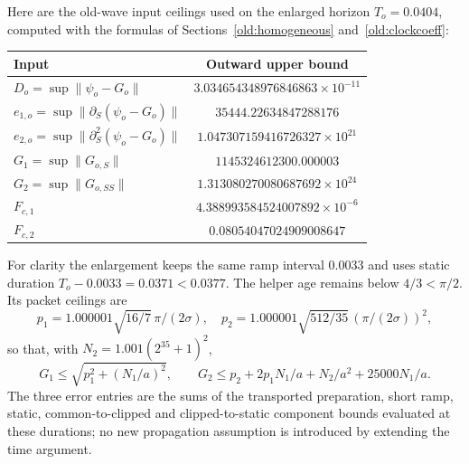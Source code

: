 \documentclass[11pt]{article}
\theoremstyle{definition}\newtheorem{definition}[theorem]{Definition}
\theoremstyle{remark}\newtheorem{remark}[theorem]{Remark}
\begin{document}
Here are the old-wave input ceilings used on the enlarged horizon
$T_o=0.0404$, computed with the formulas of
Sections~\ref{old:homogeneous} and~\ref{old:clockcoeff}:
\begin{center}
\begin{tabular}{lc}
\toprule
Input & Outward upper bound\\
\midrule
$D_o=\sup\|\psi_o-G_o\|$ & $3.034654348976846863\times10^{-11}$\\
$e_{1,o}=\sup\|\partial_S(\psi_o-G_o)\|$ & $35444.22634847288176$\\
$e_{2,o}=\sup\|\partial_S^2(\psi_o-G_o)\|$ & $1.047307159416726327\times10^{21}$\\
$G_1=\sup\|G_{o,S}\|$ & $1145324612300.000003$\\
$G_2=\sup\|G_{o,SS}\|$ & $1.313080270080687692\times10^{24}$\\
$F_{c,1}$ & $4.388993584524007892\times10^{-6}$\\
$F_{c,2}$ & $0.08054047024909008647$\\
\bottomrule
\end{tabular}
\end{center}
For clarity the enlargement keeps the same ramp interval $0.0033$ and
uses static duration $T_o-0.0033=0.0371<0.0377$.
The helper age remains below $4/3<\pi/2$.
Its packet ceilings are
\[
 p_1=1.000001\sqrt{16/7}\,\pi/(2\sigma),\quad
 p_2=1.000001\sqrt{512/35}\,(\pi/(2\sigma))^2,
\]
so that, with $N_2=1.001(2^{35}+1)^2$,
\[
 G_1\le\sqrt{p_1^2+(N_1/a)^2},\qquad
 G_2\le p_2+2p_1N_1/a+N_2/a^2+25000N_1/a.
\]
The three error entries are the sums of the transported preparation,
short ramp, static, common-to-clipped and clipped-to-static component
bounds evaluated at these durations; no new propagation assumption is
introduced by extending the time argument.
\end{document}
